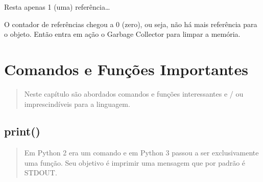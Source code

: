 \documentclass[letterpaper,10pt,brazil]{sphinxmanual}
\begin{document}
\begin{sphinxVerbatim}[commandchars=\\\{\}]
\end{sphinxVerbatim}

\begin{sphinxVerbatim}[commandchars=\\\{\}]
\end{sphinxVerbatim}

\begin{sphinxVerbatim}[commandchars=\\\{\}]
 
\end{sphinxVerbatim}

Resta apenas 1 (uma) referência…

\begin{sphinxVerbatim}[commandchars=\\\{\}]
\end{sphinxVerbatim}

\begin{sphinxVerbatim}[commandchars=\\\{\}]
\end{sphinxVerbatim}

\begin{sphinxVerbatim}[commandchars=\\\{\}]
 
\end{sphinxVerbatim}

O contador de referências chegou a 0 (zero), ou seja, não há mais referência para o objeto.
Então entra em ação o Garbage Collector para limpar a memória.


\chapter{Comandos e Funções Importantes}
\label{\detokenize{content/built-ins:comandos-e-funcoes-importantes}}\label{\detokenize{content/built-ins::doc}}\begin{quote}

Neste capítulo são abordados comandos e funções interessantes e / ou imprescindíveis para a linguagem.
\end{quote}


\section{print()}
\label{\detokenize{content/built-ins:print}}\begin{quote}

Em Python 2 era um comando e em Python 3 passou a ser exclusivamente uma função.
Seu objetivo é imprimir uma mensagem que por padrão é STDOUT.
\end{quote}
\end{document}
